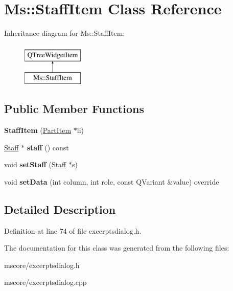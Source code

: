 \hypertarget{class_ms_1_1_staff_item}{}\section{Ms\+:\+:Staff\+Item Class Reference}
\label{class_ms_1_1_staff_item}
Inheritance diagram for Ms\+:\+:Staff\+Item\+:\begin{figure}[H]
\begin{center}
\leavevmode
\includegraphics[height=2.000000cm]{class_ms_1_1_staff_item}
\end{center}
\end{figure}
\subsection*{Public Member Functions}
\begin{DoxyCompactItemize}
\item 
\mbox{\label{class_ms_1_1_staff_item_a60c722c103572cbf17c37584fde779e2}} 
{\bfseries Staff\+Item} (\hyperlink{class_ms_1_1_part_item}{Part\+Item} $\ast$li)
\item 
\mbox{\label{class_ms_1_1_staff_item_a8e8c753b1c9c63fd8944699d7df99fc6}} 
\hyperlink{class_ms_1_1_staff}{Staff} $\ast$ {\bfseries staff} () const
\item 
\mbox{\label{class_ms_1_1_staff_item_a336bd13d2b758e9260ece7a97340ad56}} 
void {\bfseries set\+Staff} (\hyperlink{class_ms_1_1_staff}{Staff} $\ast$s)
\item 
\mbox{\label{class_ms_1_1_staff_item_adb45a8494c1a8d95659e857327554d70}} 
void {\bfseries set\+Data} (int column, int role, const Q\+Variant \&value) override
\end{DoxyCompactItemize}


\subsection{Detailed Description}


Definition at line 74 of file excerptsdialog.\+h.



The documentation for this class was generated from the following files\+:\begin{DoxyCompactItemize}
\item 
mscore/excerptsdialog.\+h\item 
mscore/excerptsdialog.\+cpp\end{DoxyCompactItemize}
